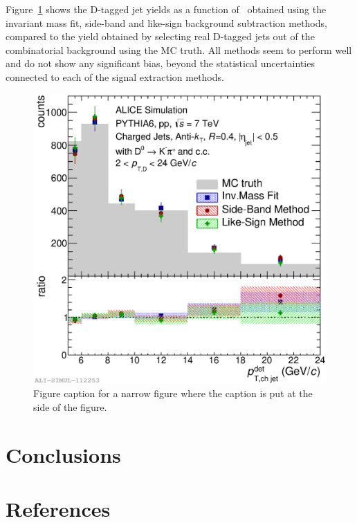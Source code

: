\documentclass[a4paper]{jpconf}
\begin{document}
Figure~\ref{} shows the D-tagged jet yields as a function of \ptchjetdet\ obtained using the invariant mass fit, side-band and like-sign background subtraction methods, compared to the yield obtained by selecting real D-tagged jets out of the 
combinatorial background using the MC truth. All methods seem to perform well and do not show any significant bias, beyond the statistical uncertainties connected to each of the signal extraction methods.

\begin{figure}[h]
\includegraphics[width=.57\textwidth]{img/HQ16_Simulation_MethodComparison}\hspace{1pc}%
\begin{minipage}[b]{.39\textwidth}\caption{\label{label}Figure caption for a narrow figure where the caption is put at the side of the figure.}
\end{minipage}
\end{figure}

\section{Conclusions}


\section*{References}
{}

\end{document}
